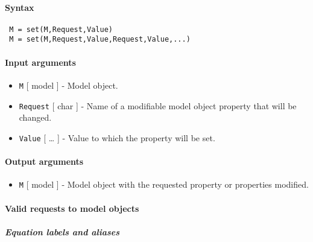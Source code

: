 


	\paragraph{Syntax}
 
 \begin{verbatim}
 M = set(M,Request,Value)
 M = set(M,Request,Value,Request,Value,...)
 \end{verbatim}
 
 \paragraph{Input arguments}
 
 \begin{itemize}
 \item
   \texttt{M} {[} model {]} - Model object.
 \item
   \texttt{Request} {[} char {]} - Name of a modifiable model object
   property that will be changed.
 \item
   \texttt{Value} {[} \ldots{} {]} - Value to which the property will be
   set.
 \end{itemize}
 
 \paragraph{Output arguments}
 
 \begin{itemize}
 \item
   \texttt{M} {[} model {]} - Model object with the requested property or
   properties modified.
 \end{itemize}
 
 \paragraph{Valid requests to model objects}
 
 \subparagraph{Equation labels and aliases}
 
